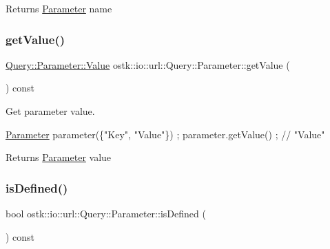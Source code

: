 \begin{DoxyReturn}{Returns}
\hyperlink{classostk_1_1io_1_1url_1_1_query_1_1_parameter}{Parameter} name 
\end{DoxyReturn}
\mbox{\label{classostk_1_1io_1_1url_1_1_query_1_1_parameter_afe5091adccaa6bcf5840d1ca88b24f9c}} 
\subsubsection{\texorpdfstring{get\+Value()}{getValue()}}
{\footnotesize\ttfamily \hyperlink{classostk_1_1io_1_1url_1_1_query_1_1_parameter_ada177e3a9d839a7900aae8a718207bbd}{Query\+::\+Parameter\+::\+Value} ostk\+::io\+::url\+::\+Query\+::\+Parameter\+::get\+Value (\begin{DoxyParamCaption}{ }\end{DoxyParamCaption}) const}



Get parameter value. 


\begin{DoxyCode}
\hyperlink{classostk_1_1io_1_1url_1_1_query_1_1_parameter_a0206a88a6546df8ec49219db4a8db3f3}{Parameter} parameter(\{\textcolor{stringliteral}{"Key"}, \textcolor{stringliteral}{"Value"}\}) ;
parameter.getValue() ; \textcolor{comment}{// "Value"}
\end{DoxyCode}


\begin{DoxyReturn}{Returns}
\hyperlink{classostk_1_1io_1_1url_1_1_query_1_1_parameter}{Parameter} value 
\end{DoxyReturn}
\mbox{\label{classostk_1_1io_1_1url_1_1_query_1_1_parameter_ad4de58e0e1efbe7dd781caecf6b98163}} 
\subsubsection{\texorpdfstring{is\+Defined()}{isDefined()}}
{\footnotesize\ttfamily bool ostk\+::io\+::url\+::\+Query\+::\+Parameter\+::is\+Defined (\begin{DoxyParamCaption}{ }\end{DoxyParamCaption}) const}




